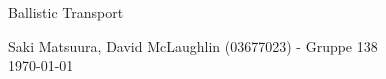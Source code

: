 \documentclass[11pt, a4paper]{article}
\begin{document}
\begin{center}

        {\huge Ballistic Transport}
    \vspace{0.1cm}

      	{Saki Matsuura, David McLaughlin (03677023) - Gruppe 138} \\
      	{\today}
    \vspace{-0.2cm}

\end{center}




\end{document}
